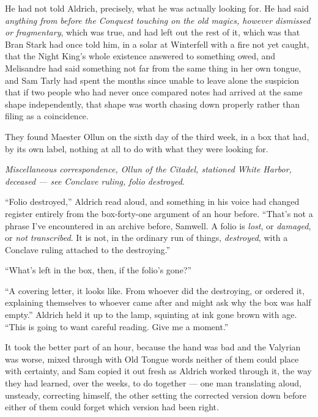 He had not told Aldrich, precisely, what he was actually looking for. He had said \textit{anything from before the Conquest touching on the old magics, however dismissed or fragmentary}, which was true, and had left out the rest of it, which was that Bran Stark had once told him, in a solar at Winterfell with a fire not yet caught, that the Night King’s whole existence answered to something owed, and Melisandre had said something not far from the same thing in her own tongue, and Sam Tarly had spent the months since unable to leave alone the suspicion that if two people who had never once compared notes had arrived at the same shape independently, that shape was worth chasing down properly rather than filing as a coincidence.

\sceneBreak

They found Maester Ollun on the sixth day of the third week, in a box that had, by its own label, nothing at all to do with what they were looking for.

\textit{Miscellaneous correspondence, Ollun of the Citadel, stationed White Harbor, deceased — see Conclave ruling, folio destroyed.}

“Folio destroyed,” Aldrich read aloud, and something in his voice had changed register entirely from the box-forty-one argument of an hour before. “That’s not a phrase I’ve encountered in an archive before, Samwell. A folio is \textit{lost}, or \textit{damaged}, or \textit{not transcribed}. It is not, in the ordinary run of things, \textit{destroyed}, with a Conclave ruling attached to the destroying.”

“What’s left in the box, then, if the folio’s gone?”

“A covering letter, it looks like. From whoever did the destroying, or ordered it, explaining themselves to whoever came after and might ask why the box was half empty.” Aldrich held it up to the lamp, squinting at ink gone brown with age. “This is going to want careful reading. Give me a moment.”

\sceneBreak

It took the better part of an hour, because the hand was bad and the Valyrian was worse, mixed through with Old Tongue words neither of them could place with certainty, and Sam copied it out fresh as Aldrich worked through it, the way they had learned, over the weeks, to do together — one man translating aloud, unsteady, correcting himself, the other setting the corrected version down before either of them could forget which version had been right.


